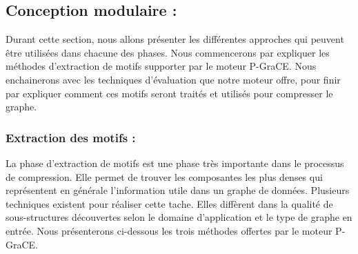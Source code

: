 \documentclass[a4paper,oneside,12pt]{report}
\theoremstyle{definition}
\begin{document}
		\subsection{Conception modulaire :}
		
		Durant cette section, nous allons présenter les différentes approches qui peuvent être utilisées dans chacune des phases. Nous commencerons par expliquer les méthodes d'extraction de motifs supporter par le moteur P-GraCE. Nous enchainerons avec les techniques d'évaluation que notre moteur offre, pour finir par expliquer comment ces motifs seront traités et utilisés pour compresser le graphe. 	
		
		
		\subsubsection{Extraction des motifs :}

La phase d'extraction de motifs est une phase très importante	 dans le processus de compression. Elle permet de trouver les composantes les plus denses qui représentent en générale l'information utile dans un graphe de données. Plusieurs techniques existent pour réaliser cette tache. Elles diffèrent dans la qualité de sous-structures découvertes selon le domaine d'application et le type de graphe en entrée. Nous présenterons ci-dessous les trois méthodes offertes par le moteur P-GraCE.
		
\end{document}

